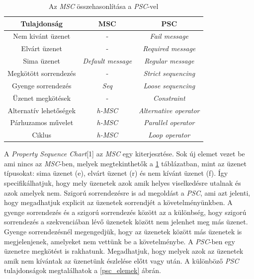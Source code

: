 \begin{table}[ht]
    \centering %
    \begin{tabular}{ |c|c|c| } %
    \hline
    \textbf{Tulajdonság} & \textbf{MSC} & \textbf{PSC} \\ [0.5ex] %
    \hline %
    \hline
    Nem kivánt üzenet & - & \textit{Fail message} \\ %
    \hline
    Elvárt üzenet & - & \textit{Required message} \\
    \hline
    Sima üzenet & \textit{Default message} & \textit{Regular message} \\
    \hline
    Megkötött sorrendezés & - & \textit{Strict sequencing} \\
    \hline
    Gyenge sorrendezés & \textit{Seq} & \textit{Loose sequencing} \\
    \hline
    Üzenet megkötések & - & \textit{Constraint} \\
    \hline
    Alternatív lehetőségek & \textit{h-MSC} & \textit{Alternative operator} \\
    \hline
    Párhuzamos művelet & \textit{h-MSC} & \textit{Parallel operator} \\
    \hline
    Ciklus & \textit{h-MSC} & \textit{Loop operator} \\
    \hline %
    \end{tabular}
    \label{psc_táblázat} %
    \caption{Az \textit{MSC} összehasonlítása a \textit{PSC}-vel} %
\end{table}

A \textit{Property Sequence Chart}[1] az \textit{MSC} egy kiterjesztése.
Sok új elemet vezet be ami nincs az \textit{MSC}-ben, melyek megtekinthetők a \ref{psc_táblázat} táblázatban, mint az üzenet típusokat: sima üzenet (e), elvárt üzenet (r) és nem kívánt üzenet (f).
Így specifikálhatjuk, hogy mely üzenetek azok amik helyes viselkedésre utalnak és azok amelyek nem.
Szigorú sorrendezésre is ad megoldást a \textit{PSC}, ami azt jelenti, hogy megadhatjuk explicit az üzenetek sorrendjét a követelményünkben.
A gyenge sorrendezés és a szigorú sorrendezés között az a különbség, hogy szigorú sorrendezés a szekvenciában lévő üzenetek között nem jelenhet meg más üzenet.
Gyenge sorrendezésnél megengedjük, hogy az üzenetek között más üzenetek is megjelenjenek, amelyeket nem vettünk be a követelménybe.
A \textit{PSC}-ben egy üzenetre megkötést is rakhatunk.
Megadhatjuk, hogy melyek azok az üzenetek amik nem kívántak az üzenetünk észlelése előtt vagy után.
A különböző \textit{PSC} tulajdonságok megtalálhatok a \ref{psc_elemek} ábrán.

